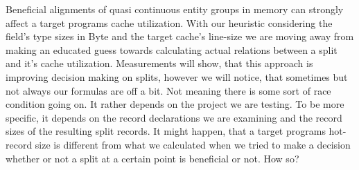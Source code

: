 Beneficial alignments of quasi continuous entity groups in memory can strongly affect a target programs cache utilization. With our heuristic considering the field's type sizes in Byte and the target cache's line-size we are moving away from making an educated guess towards calculating actual relations between a split and it's cache utilization. Measurements will show, that this approach is improving decision making on splits, however we will notice, that sometimes but not always our formulas are off a bit. Not meaning there is some sort of race condition going on. It rather depends on the project we are testing. To be more specific, it depends on the record declarations we are examining and the record sizes of the resulting split records. It might happen, that a target programs hot-record size is different from what we calculated when we tried to make a decision whether or not a split at a certain point is beneficial or not. How so?

